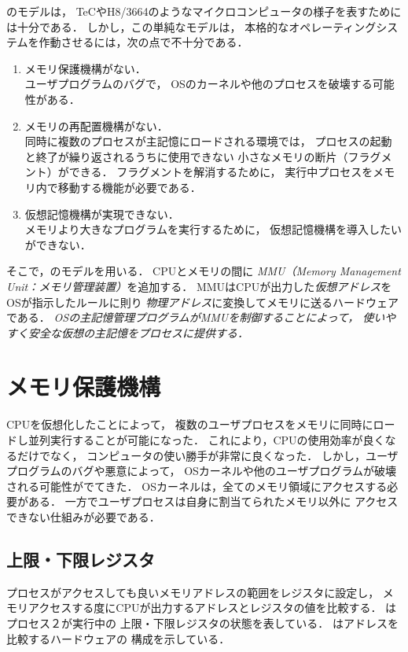 のモデルは，
TeCやH8/3664のようなマイクロコンピュータの様子を表すためには十分である．
しかし，この単純なモデルは，
本格的なオペレーティングシステムを作動させるには，次の点で不十分である．
\begin{enumerate}
\item メモリ保護機構がない．\\
  ユーザプログラムのバグで，
  OSのカーネルや他のプロセスを破壊する可能性がある．
\item メモリの再配置機構がない．\\
  同時に複数のプロセスが主記憶にロードされる環境では，
  プロセスの起動と終了が繰り返されるうちに使用できない
  小さなメモリの断片（フラグメント）ができる．
  フラグメントを解消するために，
  実行中プロセスをメモリ内で移動する機能が必要である．
\item 仮想記憶機構が実現できない．\\
  メモリより大きなプログラムを実行するために，
  仮想記憶機構を導入したいができない．
\end{enumerate}

そこで，のモデルを用いる．
CPUとメモリの間に
\emph{MMU（Memory Management Unit：メモリ管理装置）}を追加する．
MMUはCPUが出力した\emph{仮想アドレス}をOSが指示したルールに則り
\emph{物理アドレス}に変換してメモリに送るハードウェアである．
\emph{OSの主記憶管理プログラムがMMUを制御することによって，
  使いやすく安全な仮想の主記憶をプロセスに提供する．}

\section{メモリ保護機構}
CPUを仮想化したことによって，
複数のユーザプロセスをメモリに同時にロードし並列実行することが可能になった．
これにより，CPUの使用効率が良くなるだけでなく，
コンピュータの使い勝手が非常に良くなった．
しかし，ユーザプログラムのバグや悪意によって，
OSカーネルや他のユーザプログラムが破壊される可能性がでてきた．
OSカーネルは，全てのメモリ領域にアクセスする必要がある．
一方でユーザプロセスは自身に割当てられたメモリ以外に
アクセスできない仕組みが必要である．

\subsection{上限・下限レジスタ}
プロセスがアクセスしても良いメモリアドレスの範囲をレジスタに設定し，
メモリアクセスする度にCPUが出力するアドレスとレジスタの値を比較する．
はプロセス２が実行中の
上限・下限レジスタの状態を表している．
はアドレスを比較するハードウェアの
構成を示している．

